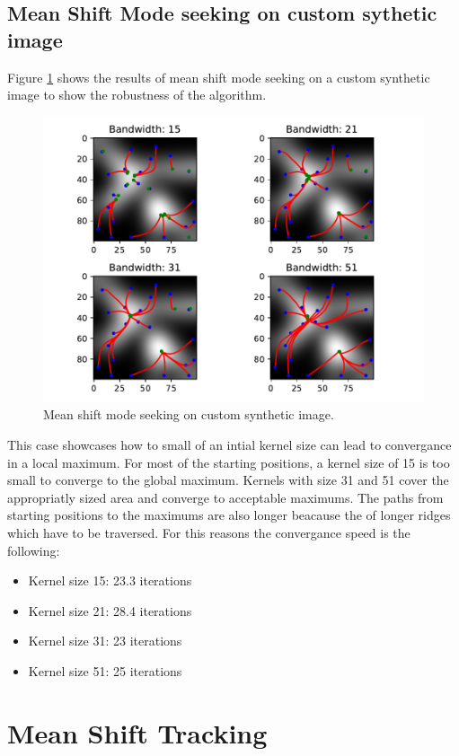 \documentclass[9pt]{IEEEtran}
\begin{document}
\subsection{Mean Shift Mode seeking on custom sythetic image}
Figure \ref{fig:mean_shift_custom} shows the results of mean shift mode seeking on a custom synthetic image to show the robustness of the algorithm.
\begin{figure}[h]
    \centering
    \includegraphics[width=1\columnwidth]{mean_shift_custom.pdf}
    \caption{Mean shift mode seeking on custom synthetic image.}
    \label{fig:mean_shift_custom}
\end{figure}
This case showcases how to small of an intial kernel size can lead to convergance in a local maximum.
For most of the starting positions, a kernel size of 15 is too small to converge to the global maximum.
Kernels with size 31 and 51 cover the appropriatly sized area and converge to acceptable maximums.
The paths from starting positions to the maximums are also longer beacause the of longer ridges which have to be traversed.
For this reasons the convergance speed is the following:
\begin{itemize}
    \item Kernel size 15: 23.3 iterations
    \item Kernel size 21: 28.4 iterations
    \item Kernel size 31: 23 iterations
    \item Kernel size 51: 25 iterations
\end{itemize}

\section[short]{Mean Shift Tracking}
\end{document}
